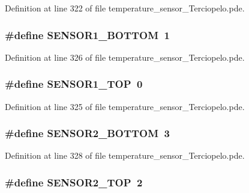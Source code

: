 Definition at line 322 of file temperature\_\-sensor\_\-Terciopelo.pde.\hypertarget{temperature__sensor___terciopelo_8pde_0da2a51dcb3e00b10aedd07d75f22382}{
\subsubsection[{SENSOR1\_\-BOTTOM}]{\setlength{\rightskip}{0pt plus 5cm}\#define SENSOR1\_\-BOTTOM~1}}
\label{temperature__sensor___terciopelo_8pde_0da2a51dcb3e00b10aedd07d75f22382}




Definition at line 326 of file temperature\_\-sensor\_\-Terciopelo.pde.\hypertarget{temperature__sensor___terciopelo_8pde_2a2946288d28852ba343b09fd4f17d7a}{
\subsubsection[{SENSOR1\_\-TOP}]{\setlength{\rightskip}{0pt plus 5cm}\#define SENSOR1\_\-TOP~0}}
\label{temperature__sensor___terciopelo_8pde_2a2946288d28852ba343b09fd4f17d7a}




Definition at line 325 of file temperature\_\-sensor\_\-Terciopelo.pde.\hypertarget{temperature__sensor___terciopelo_8pde_df66e6da6cf8c78004dc0a75fd14d3b1}{
\subsubsection[{SENSOR2\_\-BOTTOM}]{\setlength{\rightskip}{0pt plus 5cm}\#define SENSOR2\_\-BOTTOM~3}}
\label{temperature__sensor___terciopelo_8pde_df66e6da6cf8c78004dc0a75fd14d3b1}




Definition at line 328 of file temperature\_\-sensor\_\-Terciopelo.pde.\hypertarget{temperature__sensor___terciopelo_8pde_645141ae2ab7fa7ac3f690c4959b6baf}{
\subsubsection[{SENSOR2\_\-TOP}]{\setlength{\rightskip}{0pt plus 5cm}\#define SENSOR2\_\-TOP~2}}
\label{temperature__sensor___terciopelo_8pde_645141ae2ab7fa7ac3f690c4959b6baf}




